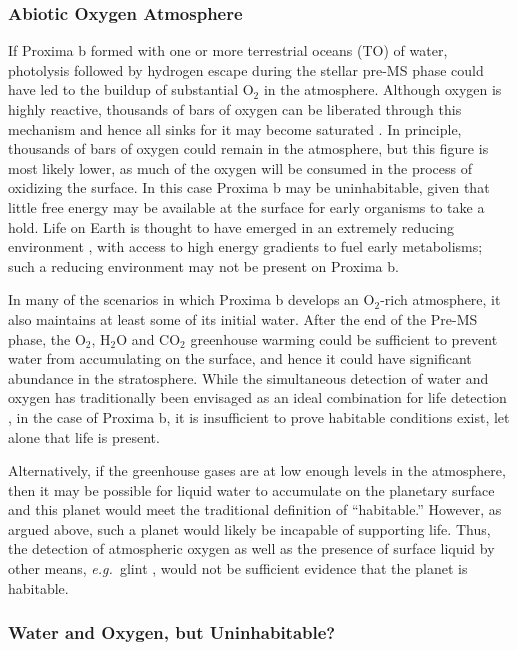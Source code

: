 \documentclass[preprint,12pt]{aastex}
\def\eg{{\it e.g.\ }}
\begin{document}
\subsubsection{Abiotic Oxygen Atmosphere}
\label{sec:results:atmstates:o2atmos}

If Proxima b formed with one or more terrestrial oceans (TO) of water, photolysis followed
by hydrogen escape during the stellar pre-MS phase could have led to
the buildup of substantial O$_2$ in the atmosphere. Although oxygen is
highly reactive, thousands of bars of oxygen can be liberated through
this mechanism \citep{LugerBarnes15} and hence all sinks for it may
become saturated \citep{Schaefer16}. In principle, thousands of bars
of oxygen could remain in the atmosphere, but this figure is most
likely lower, as much of the oxygen will be consumed in the process of
oxidizing the surface.  In this case Proxima b may be uninhabitable,
given that little free energy may be available at the surface for
early organisms to take a hold. Life on Earth is thought to have
emerged in an extremely reducing environment \citep{Oparin24,
  Haldane29}, with access to high energy gradients to fuel early
metabolisms; such a reducing environment may not be present on Proxima b.

In many of the scenarios in which Proxima b develops an O$_2$-rich
atmosphere, it also maintains at least some of its initial water.
After the end of the Pre-MS phase, the O$_2$, H$_2$O and CO$_2$
greenhouse warming could be sufficient to prevent water from
accumulating on the surface, and hence it could have significant
abundance in the stratosphere. While the simultaneous detection of
water and oxygen has traditionally been envisaged as an ideal
combination for life detection \citep{DesMarais2002}, in the case of
Proxima b, it is insufficient to prove habitable conditions exist, let
alone that life is present.

Alternatively, if the greenhouse gases are at low enough levels in the
atmosphere, then it may be possible for liquid water to accumulate on
the planetary surface and this planet would meet the traditional
definition of ``habitable.'' However, as argued above, such a planet
would likely be incapable of supporting life.  Thus, the detection of
atmospheric oxygen as well as the presence of surface liquid by other
means, \eg glint \citep{Robinson10}, would not be sufficient evidence
that the planet is habitable.

\subsubsection{Water and Oxygen, but Uninhabitable?}
\end{document}
